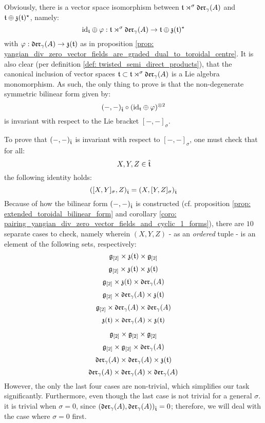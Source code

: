         \begin{remark} \label{remark: yangian_extended_toroidal_lie_algebras_main_theorem_if_direction_proof_outline}
            Obviously, there is a vector space isomorphism between $\mathfrak{t} \rtimes^{\sigma} \mathfrak{der}_{\gamma}(A)$ and $\mathfrak{t} \oplus \mathfrak{z}(\mathfrak{t})^{\star}$, namely:
                $$\mathrm{id}_{\mathfrak{t}} \oplus \varphi: \mathfrak{t} \rtimes^{\sigma} \mathfrak{der}_{\gamma}(A) \to \mathfrak{t} \oplus \mathfrak{z}(\mathfrak{t})^{\star}$$
            with $\varphi: \mathfrak{der}_{\gamma}(A) \to \mathfrak{z}(\mathfrak{t})$ as in proposition \ref{prop: yangian_div_zero_vector_fields_are_graded_dual_to_toroidal_centre}. It is also clear (per definition \ref{def: twisted_semi_direct_products}), that the canonical inclusion of vector spaces $\mathfrak{t} \subset \mathfrak{t} \rtimes^{\sigma} \mathfrak{der}_{\gamma}(A)$ is a Lie algebra monomorphism. As such, the only thing to prove is that the non-degenerate symmetric bilinear form given by:
                $$(-, -)_{\extendedtoroidal} \circ (\id_{\toroidal} \oplus \varphi)^{\tensor 2}$$
            is invariant with respect to the Lie bracket $[-, -]_{\sigma}$.

            To prove that $(-, -)_{\hat{\mathfrak{t}}}$ is invariant with respect to $[-, -]_{\sigma}$, one must check that for all:
                $$X, Y, Z \in \hat{\mathfrak{t}}$$
            the following identity holds:
                $$( [X, Y]_{\sigma}, Z )_{\hat{\mathfrak{t}}} = ( X, [Y, Z]_{\sigma} )_{\hat{\mathfrak{t}}}$$
            Because of how the bilinear form $(-, -)_{\hat{\mathfrak{t}}}$ is constructed (cf. proposition \ref{prop: extended_toroidal_bilinear_form} and corollary \ref{coro: pairing_yangian_div_zero_vector_fields_and_cyclic_1_forms}), there are $10$ separate cases to check, namely wherein $(X, Y, Z)$ - as an \textit{ordered} tuple - is an element of the following sets, respectively:
                $$\g_{[2]} \x \z(\toroidal) \x \g_{[2]}$$
                $$\g_{[2]} \x \z(\toroidal) \x \z(\toroidal)$$
                $$\g_{[2]} \x \z(\toroidal) \x \divzero$$
                $$\g_{[2]} \x \divzero \x \z(\toroidal)$$
                $$\g_{[2]} \x \divzero \x \divzero$$
                $$\z(\toroidal) \x \divzero \x \z(\toroidal)$$
                
                $$\g_{[2]} \x \g_{[2]} \x \g_{[2]}$$
                $$\g_{[2]} \x \g_{[2]} \x \divzero$$
                $$\divzero \x \divzero \x \z(\toroidal)$$
                $$\divzero \x \divzero \x \divzero$$
            However, the only the last four cases are non-trivial, which simplifies our task significantly. Furthermore, even though the last case is not trivial for a general $\sigma$. it is trivial when $\sigma = 0$, since $(\mathfrak{der}_{\gamma}(A), \mathfrak{der}_{\gamma}(A))_{\hat{\mathfrak{t}}} = 0$; therefore, we will deal with the case where $\sigma = 0$ first.
        \end{remark}

